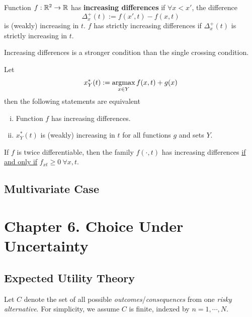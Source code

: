 \documentclass{report}
\begin{document}
			\begin{definition}
				Function $f: \mathbb{R}^2 \to \mathbb{R}$ has \textbf{increasing differences} if $\forall x < x'$, the difference
				\begin{equation}
					\Delta^+_x(t) := f(x', t) - f(x, t)
				\end{equation}
				is (weakly) increasing in $t$. $f$ has strictly increasing differences if $\Delta^+_x(t)$ is strictly increasing in $t$.
			\end{definition}
			
			\begin{remark}
				Increasing differences is a stronger condition than the single crossing condition.
			\end{remark}
			
			\begin{theorem}
				Let 
				\begin{equation}
					x_Y^*(t) := \operatorname*{argmax}_{x \in Y} f(x, t) + g(x)
				\end{equation}
				then the following statements are equivalent
				\begin{enumerate}[(i)]
					\item Function $f$ has increasing differences.
					\item $x_Y^*(t)$ is (weakly) increasing in $t$ for all functions $g$ and sets $Y$.
				\end{enumerate}
			\end{theorem}
			
			\begin{lemma}
				If $f$ is twice differentiable, then the family $f(\cdot, t)$ has increasing differences \ul{if and only if} $f_{xt} \geq 0\ \forall x, t$.
			\end{lemma}
			
		\subsection{Multivariate Case}
	
	\section{Chapter 6. Choice Under Uncertainty}
		\subsection{Expected Utility Theory}
			\begin{assumption}
	 			Let $C$ denote the set of all possible \emph{outcomes}/\emph{consequences} from one \emph{risky alternative}. For simplicity, we assume $C$ is finite, indexed by $n=1, \cdots, N$.
	 		\end{assumption}
	 		
\end{document}
